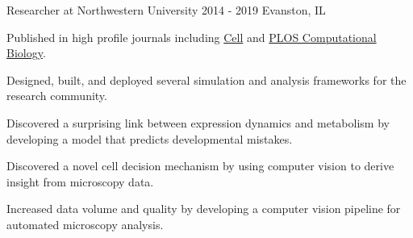 \begin{cventries}
  \cventrynew
	{Researcher at Northwestern University}    
    {2014 - 2019} 
    {Evanston, IL} 
    { \begin{cvitems}	
		\item {Published in high profile journals including \href{https://doi.org/10.1016/j.cell.2019.06.023}{Cell} and \href{https://doi.org/10.1371/journal.pcbi.1007406}{PLOS Computational Biology}.}
		\item {Designed, built, and deployed several simulation and analysis frameworks for the research community.}
		\item {Discovered a surprising link between expression dynamics and metabolism by developing a model that predicts developmental mistakes.}
		\item {Discovered a novel cell decision mechanism by using computer vision to derive insight from microscopy data.}
		\item {Increased data volume and quality by developing a computer vision pipeline for automated microscopy analysis.}
	  \end{cvitems}
     }
     


\end{cventries}
